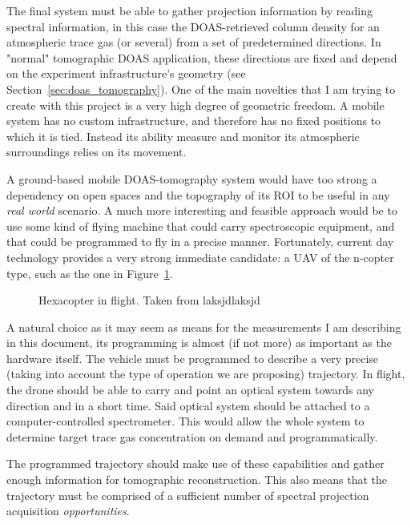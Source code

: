 The final system must be able to gather projection information by
reading spectral information, in this case the \gls{DOAS}-retrieved
column density for an atmospheric trace gas (or several) from a set of
predetermined directions. In "normal" tomographic \gls{DOAS}
application, these directions are fixed and depend on the experiment
infrastructure's geometry (see Section~\ref{sec:doas_tomography}). One
of the main novelties that I am trying to create with this project is a
very high degree of geometric freedom. A mobile system has no custom
infrastructure, and therefore has no fixed positions to which it is
tied. Instead its ability measure and monitor its atmospheric
surroundings relies on its movement. 

A ground-based mobile \gls{DOAS}-tomography system would have too strong
a dependency on open spaces and the topography of its \gls{ROI} to be
useful in any \textit{real world} scenario. A much more interesting and
feasible approach would be to use some kind of flying machine that could
carry spectroscopic equipment, and that could be programmed to fly in a
precise manner. Fortunately, current day technology provides a very
strong immediate candidate: a \gls{UAV} of the n-copter type, such as
the one in Figure~\ref{fig:an_hexacopter}.

\begin{figure}[htpb]
    \centering
    \caption{Hexacopter in flight. Taken from laksjdlaksjd}
    \label{fig:an_hexacopter}
\end{figure}

A natural choice as it may seem as means for the measurements I am
describing in this document, its programming is almost (if not more) as
important as the hardware itself. The vehicle must be programmed to
describe a very precise (taking into account the type of operation we
are proposing) trajectory. In flight, the drone should be able to carry
and point an optical system towards any direction and in a short time.
Said optical system should be attached to a computer-controlled
spectrometer. This would allow the whole system to determine target
trace gas concentration on demand and programmatically.

The programmed trajectory should make use of these capabilities and
gather enough information for tomographic reconstruction. This also
means that the trajectory must be comprised of a sufficient number of
spectral projection acquisition \emph{opportunities}.

